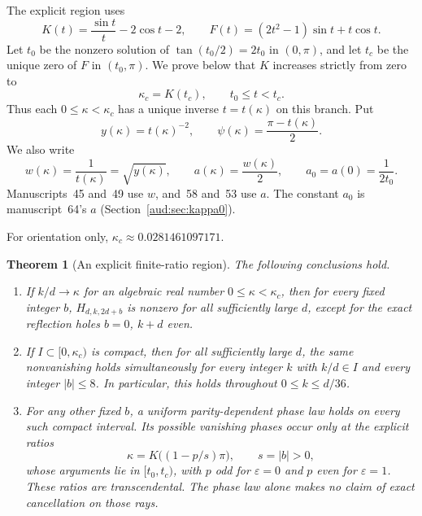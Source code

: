 \documentclass[11pt,a4paper]{article}
\numberwithin{equation}{section}
\newtheorem{theorem}{Theorem}[section]
\begin{document}
The explicit region uses
\begin{equation}\label{aud:fr:Kintro}
 K(t)=\frac{\sin t}{t}-2\cos t-2,
 \qquad F(t)=(2t^2-1)\sin t+t\cos t.
\end{equation}
Let $t_0$ be the nonzero solution of $\tan(t_0/2)=2t_0$ in $(0,\pi)$, and let $t_c$ be the unique zero of $F$ in $(t_0,\pi)$. We prove below that $K$ increases strictly from zero to
\[
 \kappa_c=K(t_c),\qquad
 t_0\le t<t_c.
\]
Thus each $0\le\kappa<\kappa_c$ has a unique inverse $t=t(\kappa)$ on this branch. Put
\begin{equation}\label{aud:fr:phaseintro}
 y(\kappa)=t(\kappa)^{-2},\qquad
 \psi(\kappa)=\frac{\pi-t(\kappa)}2.
\end{equation}
We also write
\begin{equation}\label{aud:eq:wa}
 w(\kappa)=\frac1{t(\kappa)}=\sqrt{y(\kappa)},\qquad a(\kappa)=\frac{w(\kappa)}2,\qquad a_0=a(0)=\frac1{2t_0}.
\end{equation}
Manuscripts~45 and~49 use $w$, and~58 and~53 use $a$. The constant $a_0$ is manuscript~64's $a$ (Section~\ref{aud:sec:kappa0}).

For orientation only, $\kappa_c\approx0.0281461097171$.

\begin{theorem}[An explicit finite-ratio region]\label{aud:fr:main}
The following conclusions hold.
\begin{enumerate}
\item If $k/d\to\kappa$ for an algebraic real number $0\le\kappa<\kappa_c$, then for every fixed integer $b$, $H_{d,k,2d+b}$ is nonzero for all sufficiently large $d$, except for the exact reflection holes $b=0$, $k+d$ even.
\item If $I\subset[0,\kappa_c)$ is compact, then for all sufficiently large $d$, the same nonvanishing holds simultaneously for every integer $k$ with $k/d\in I$ and every integer $|b|\le8$. In particular, this holds throughout $0\le k\le d/36$.
\item For any other fixed $b$, a uniform parity-dependent phase law holds on every such compact interval. Its possible vanishing phases occur only at the explicit ratios
\[
 \kappa=K\bigl((1-p/s)\pi\bigr),\qquad s=|b|>0,
\]
whose arguments lie in $[t_0,t_c)$, with $p$ odd for $\varepsilon=0$ and $p$ even for $\varepsilon=1$. These ratios are transcendental. The phase law alone makes no claim of exact cancellation on those rays.
\end{enumerate}
\end{theorem}
\end{document}

